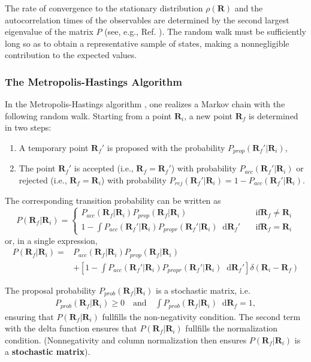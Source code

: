 \documentclass[twoside,english]{uiofysmaster}
\newcommand*\dif{\mathop{}\!\mathrm{d}}
\begin{document}
The rate of convergence to the stationary distribution $\rho(\bm{R})$ and the autocorrelation times of the observables are determined by the second largest eigenvalue of the matrix $P$ (see, e.g., Ref. \cite{Gilks1996}). The random walk must be sufficiently long so as to obtain a representative sample of states, making a nonnegligible contribution to the expected values. 
\cite{Toulouse2016}

\subsubsection{The Metropolis-Hastings Algorithm}
In the Metropolis-Hastings algorithm , one realizes a Markov chain with the following random walk. Starting from a point $\bm{R}_i$, a new point $\bm{R}_f$ is determined in two steps:
\begin{enumerate}
	\item A temporary point $\bm{R}_f'$ is proposed with the probability $P_{prop} (\bm{R}_f' | \bm{R}_i)$,
	\item The point $\bm{R}_f'$ is accepted (i.e., $\bm{R}_f = \bm{R}_f'$) with probability $P_{acc} (\bm{R}_f' | \bm{R}_i)$ or rejected (i.e., $\bm{R}_f = \bm{R}_i$) with probability $P_{rej}(\bm{R}_f' | \bm{R}_i) = 1 - P_{acc} (\bm{R}_f' | \bm{R}_i)$.
\end{enumerate}
The corresponding transition probability can be written as
\[ P(\bm{R}_f |\bm{R}_i ) = \begin{cases}
				P_{acc}(\bm{R}_f |\bm{R}_i ) P_{prop} (\bm{R}_f |\bm{R}_i )  
				& \quad \text{if} \bm{R}_f \neq \bm{R}_i \\
				1 - \int  P_{acc}(\bm{R}_f' |\bm{R}_i ) P_{propr} (\bm{R}_f' |\bm{R}_i )  \dif \bm{R}_f'
				& \quad \text{if} \bm{R}_f = \bm{R}_i  
\end{cases} \]
or, in a single expression,
\begin{align}
	P(\bm{R}_f |\bm{R}_i ) =& P_{acc}(\bm{R}_f |\bm{R}_i ) P_{prop} (\bm{R}_f |\bm{R}_i ) \\
	&+ [1-\int  P_{acc}(\bm{R}_f' |\bm{R}_i ) P_{propr} (\bm{R}_f' |\bm{R}_i )  \dif \bm{R}_f'] \delta(\bm{R}_i - \bm{R}_f)
\end{align}

The proposal probability $P_{prob}(\bm{R}_f |\bm{R}_i )$ is a stochastic matrix, i.e.
\begin{align}
	P_{prob}(\bm{R}_f |\bm{R}_i ) \geq 0 \quad \text{and} \quad
	\int P_{prob}(\bm{R}_f |\bm{R}_i ) \dif \bm{R}_f = 1,
\end{align}
ensuring that $P(\bm{R}_f| \bm{R}_i)$ fullfills the non-negativity condition. The second term with the delta function ensures that $P(\bm{R}_f| \bm{R}_i)$ fullfills the normalization condition. (Nonnegativity and column normalization then ensures $P(\bm{R}_f| \bm{R}_i)$ is a \textbf{stochastic matrix}).
\end{document}

